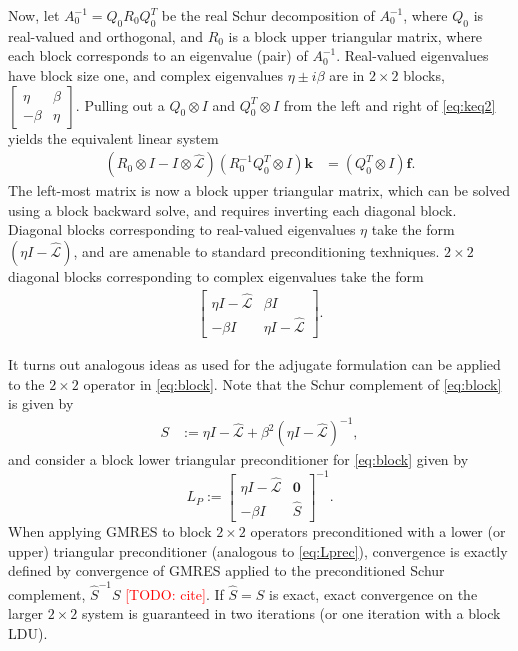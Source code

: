 \documentclass[review]{siamart}
\makeatletter
\newcommand{\todo}[1]{\textcolor{red}{[TODO\@: #1]}}
\makeatother
\begin{document}
Now, let $A_0^{-1} = Q_0R_0Q_0^T$ be the real Schur decomposition of $A_0^{-1}$, where
$Q_0$ is real-valued and orthogonal, and $R_0$ is a block
upper triangular matrix, where each block corresponds to an eigenvalue (pair) of
$A_0^{-1}$. Real-valued eigenvalues have block size one, and complex eigenvalues
$\eta\pm i\beta$ are in $2\times 2$ blocks,
$\begin{bmatrix} \eta & \beta\\-\beta & \eta\end{bmatrix}.$
Pulling out a $Q_0\otimes I$ and $Q_0^T\otimes I$ from the left and right of
\eqref{eq:keq2} yields the equivalent linear system
%
\begin{align}\label{eq:keq3}
\left( R_0\otimes I - I \otimes \widehat{\mathcal{L}}\right)
	(R_0^{-1}Q_0^T\otimes I) \mathbf{k} & = (Q_0^T\otimes I)\mathbf{f}.
\end{align}
%
The left-most matrix is now a block upper triangular matrix, which can be solved
using a block backward solve, and requires inverting each diagonal block. Diagonal
blocks corresponding to real-valued eigenvalues $\eta$ take the form
$(\eta I - \widehat{\mathcal{L}})$, and are amenable to standard preconditioning
texhniques. $2\times 2$ diagonal blocks corresponding to complex eigenvalues
take the form
%
\begin{align}\label{eq:block}
\begin{bmatrix} \eta I - \widehat{\mathcal{L}} & \beta I\\
-\beta I & \eta I - \widehat{\mathcal{L}}\end{bmatrix}.
\end{align}
%

It turns out analogous ideas as used for the adjugate formulation can be applied
to the $2\times 2$ operator in \eqref{eq:block}. Note that the Schur complement
of \eqref{eq:block} is given by
%
\begin{align}\label{eq:simpSchur}
S & := \eta I - \widehat{\mathcal{L}} + \beta^2 (\eta I - \widehat{\mathcal{L}})^{-1},
\end{align}
%
and consider a block lower triangular preconditioner for \eqref{eq:block} given by
%
\begin{equation}\label{eq:Lprec}
L_P := \begin{bmatrix} \eta I - \widehat{\mathcal{L}} & \mathbf{0} \\ -\beta I
	& \widehat{S}\end{bmatrix}^{-1}.
\end{equation}
%
When applying GMRES to block $2\times 2$ operators preconditioned with a lower
(or upper) triangular preconditioner (analogous to \eqref{eq:Lprec}), convergence 
is exactly defined by convergence of GMRES applied to the preconditioned Schur
complement, $\widehat{S}^{-1}S$ \todo{cite}. If $\widehat{S} = S$ is exact, exact
convergence on the larger $2\times2$ system is guaranteed in two iterations
(or one iteration with a block LDU).
\end{document}
